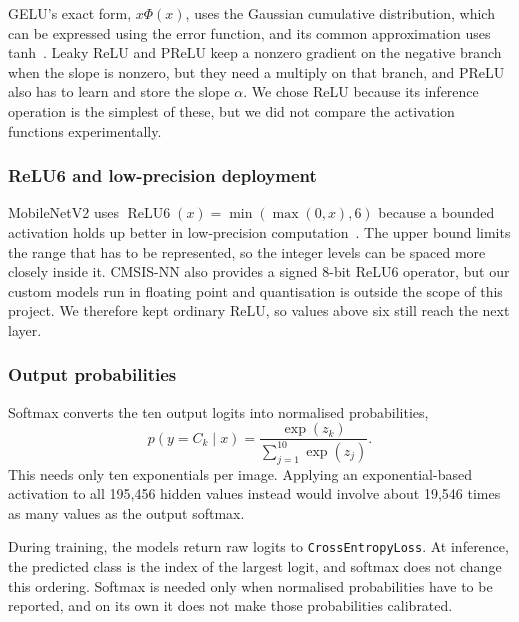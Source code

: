 GELU's exact form, $x\Phi(x)$, uses the Gaussian cumulative distribution,
which can be expressed using the error function, and its common approximation uses
tanh~\cite{hendrycks2016gelu}.
Leaky ReLU and PReLU keep a nonzero gradient on the negative branch when the
slope is nonzero, but they need a multiply on that branch, and PReLU also has
to learn and store the slope $\alpha$.  We chose ReLU because its inference
operation is the simplest of these, but we did not compare the activation
functions experimentally.

\subsubsection{ReLU6 and low-precision deployment}

MobileNetV2 uses
$\operatorname{ReLU6}(x)=\min(\max(0,x),6)$ because a bounded activation holds
up better in low-precision computation~\cite[Sec.~4]{sandler2018mobilenetv2}.
The upper bound limits the range that has to be represented, so the integer
levels can be spaced more closely inside it.  CMSIS-NN also provides a signed
8-bit ReLU6 operator, but our custom models run in floating point and
quantisation is outside the scope of this project.  We therefore kept ordinary
ReLU, so values above six still reach the next layer.

\subsubsection{Output probabilities}

Softmax converts the ten output logits into normalised probabilities,
\begin{equation}
  p(y=C_k\mid x)=\frac{\exp(z_k)}{\sum_{j=1}^{10}\exp(z_j)}.
\end{equation}
This needs only ten exponentials per image.  Applying an exponential-based
activation to all 195,456 hidden values instead would involve about 19,546
times as many values as the output softmax.

During training, the models return raw logits to \texttt{CrossEntropyLoss}.
At inference, the predicted class is the index of the largest logit, and
softmax does not change this ordering.  Softmax is needed only when normalised
probabilities have to be reported, and on its own it does not make those
probabilities calibrated.
